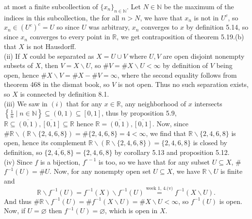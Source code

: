 \documentclass[a4paper]{article}
\begin{document}
    at most a finite subcollection of $\{x_n\}_{n \in \mathbb{N}}$. Let $N \in
    \mathbb{N}$ be the maximum of the
    indices in this subcollection, the for all $n> N$, we have
    that $x_n$ is not in $U^{c}$, so $x_n \in \left( U^{c} \right)^{c} = U$
    so since $U$ was arbitrary, $x_n$ converges to $x$ by definition 5.14, 
    so since $x_n$ converges to every point in $\mathbb{R}$, we get
    contraposition of
    theorem 5.19.(b) that $X$ is not Hausdorff.\\
    \linebreak
    (ii) If $X$ could be separated as $X = U \cup V$ where $U,V$ are open
    disjoint nonempty subsets of $X$, then $V = X \backslash U$, so
    $\# V = \# X \backslash U < \infty$ by definition of $V$ being open, hence
    $\# X \backslash V = \# X - \# V = \infty$, where the second equality
    follows from theorem 468 in the dismat book, so $V$ is not open. Thus no
    such separation exists, so $X$ is connected by definition 8.1.\\
    \linebreak
    (iii) We saw in $(i)$ that for any $x \in \mathbb{R}$, any neighborhood of
    $x$ intersects $\left\{ \frac{1}{n}  \mid n \in \mathbb{N} \right\}
    \subseteq (0,1) \subseteq [0,1]$, thus by proposition 5.9, 
    $\mathbb{R} \subseteq \overline{(0,1)}, \overline{[0,1]} \subseteq
    \mathbb{R}$ hence
    $\mathbb{R} = \overline{(0,1)}, \overline{[0,1]} $. Now, since
    $\# \mathbb{R} \backslash \left( \mathbb{R}\backslash \{2,4,6,8\} \right) 
    = \# \{2,4,6,8\} = 4 < \infty$, we find that $\mathbb{R} \backslash
    \{2,4,6,8\}$ is open, hence its complement 
    $\mathbb{R} \backslash \left( \mathbb{R} \backslash \{2,4,6,8\} \right) =
        \{2,4,6,8\}$ is closed by definition, so $\overline{\{2,4,6,8\}} = \{2,4,6,8\}$ 
        by corollary 5.13 and proposition 5.12.\\
        \linebreak
        (iv) Since $f$ is a bijection, $f^{\circ -1}$ is too, so we have that for any subset
        $U \subseteq X$, \# $f^{-1}(U) = \# U$. Now, for any nonempty open set
        $U \subseteq X$, we have $\mathbb{R} \backslash U$ is finite and
        \[
        \mathbb{R} \backslash f^{-1}(U) = f^{-1}(X) \backslash f^{-1}(U)
        \stackrel{\text{week 1, 4.(v)}}{=} f^{-1}\left( X \backslash U \right) 
        .\] 
        And thus
        $\# \mathbb{R} \backslash f^{-1}(U) = \# f^{-1}(X \backslash U) = \#
        X \backslash U < \infty$, so $f^{-1}(U)$ is open. Now, if
        $U = \varnothing$ then $f^{-1}(U) = \varnothing$, which is open in $X$.
\end{document}

